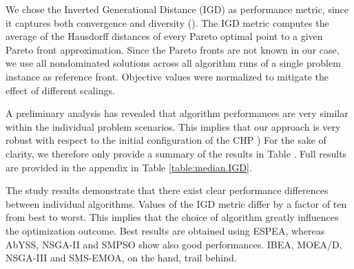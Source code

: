We chose the Inverted Generational Distance (IGD) as performance metric, since it captures both convergence and diversity (\cite{van1998evolutionary}). The IGD metric computes the average of the Hausdorff distances of every Pareto optimal point to a given Pareto front approximation. Since the Pareto fronts are not known in our case, we use all nondominated solutions across all algorithm runs of a single problem instance as reference front. Objective values were normalized to mitigate the effect of different scalings.

A preliminary analysis has revealed that algorithm performances are very similar within the individual problem scenarios. This implies that our approach is very robust with respect to the initial configuration of the CHP ) For the sake of clarity, we therefore only provide a summary of the results in Table . Full results are provided in the appendix in Table \ref{table:median.IGD}.


The study results demonstrate that there exist clear performance differences between individual algorithms. Values of the IGD metric differ by a factor of ten from best to worst. This implies that the choice of algorithm greatly influences the optimization outcome. Best results are obtained using ESPEA, whereas AbYSS, NSGA-II and SMPSO show also good performances. IBEA, MOEA/D, NSGA-III and SMS-EMOA, on the hand, trail behind.












